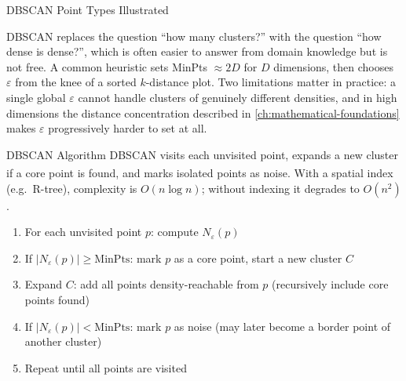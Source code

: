 \begin{v3topic}{DBSCAN Point Types Illustrated}
\label{fig:ml-dbscan-points}

\begin{engineernote}
DBSCAN replaces the question ``how many clusters?'' with the question ``how
dense is dense?'', which is often easier to answer from domain knowledge but is
not free. A common heuristic sets MinPts $\approx 2D$ for $D$ dimensions, then
chooses $\varepsilon$ from the knee of a sorted $k$-distance plot. Two
limitations matter in practice: a single global $\varepsilon$ cannot handle
clusters of genuinely different densities, and in high dimensions the distance
concentration described in \cref{ch:mathematical-foundations} makes
$\varepsilon$ progressively harder to set at all.
\end{engineernote}

\end{v3topic}
\begin{v3topic}{DBSCAN Algorithm}
    DBSCAN visits each unvisited point, expands a new cluster if a core point is found, and marks isolated points as noise\textsuperscript{\cite[][pp.~474--477]{hanDataMiningConcepts2012}}. With a spatial index (e.g.\ R-tree), complexity is $O(n \log n)$; without indexing it degrades to $O(n^2)$.
\visualseparator
    \begin{enumerate}
        \item For each unvisited point $p$: compute $N_\varepsilon(p)$
        \item If $|N_\varepsilon(p)| \geq \text{MinPts}$: mark $p$ as a core point, start a new cluster $C$
        \item Expand $C$: add all points density-reachable from $p$ (recursively include core points found)
        \item If $|N_\varepsilon(p)| < \text{MinPts}$: mark $p$ as noise (may later become a border point of another cluster)
        \item Repeat until all points are visited
    \end{enumerate}
\end{v3topic}

